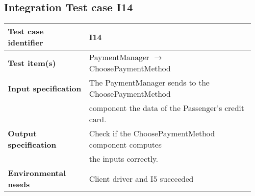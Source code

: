 	\subsection{Integration Test case I14}
		\begin{tabular}{ l l}
			\hline 		\textbf{Test case identifier} & I14 \\
			\hline		\textbf{Test item(s)}  & PaymentManager $\rightarrow$ ChoosePaymentMethod \\
			\hline		\textbf{Input specification} & The PaymentManager sends to the ChoosePaymentMethod \\ & component the data of the Passenger's credit card.\\
			\hline		\textbf{Output specification} & Check if the ChoosePaymentMethod component computes \\ & the inputs correctly.\\
			\hline		\textbf{Environmental needs} & Client driver and I5 succeeded\\
			\hline
		\end{tabular}